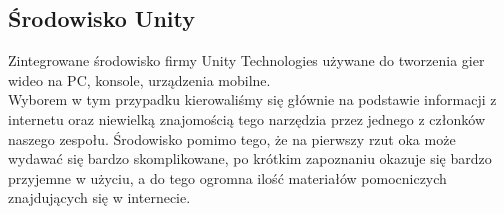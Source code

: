 \subsection{Środowisko Unity}
Zintegrowane środowisko firmy Unity Technologies używane do tworzenia gier wideo na PC, konsole, urządzenia mobilne.\\
Wyborem w tym przypadku kierowaliśmy się głównie na podstawie informacji z internetu oraz niewielką znajomością tego narzędzia przez jednego z członków naszego zespołu. Środowisko pomimo tego, że na pierwszy rzut oka może wydawać się bardzo skomplikowane, po krótkim zapoznaniu okazuje się bardzo przyjemne w użyciu, a do tego ogromna ilość materiałów pomocniczych znajdujących się w internecie.